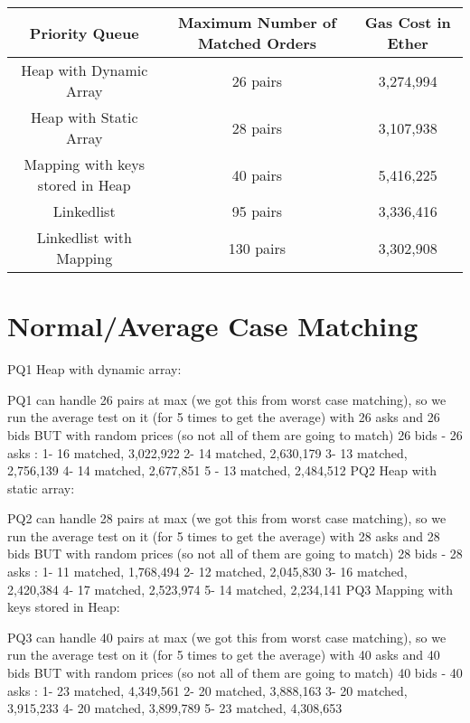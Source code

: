 \begin{table}[t]
\centering
\begin{tabular}{|c|c|c|}
\hline
\textbf{Priority Queue} & \textbf{Maximum Number of Matched Orders} & \textbf{Gas Cost in Ether}  \\ \hline
 
Heap with Dynamic Array & 26 pairs & 3,274,994 \\ \hline
Heap with Static Array & 28 pairs & 3,107,938 \\ \hline
Mapping with keys stored in Heap & 40 pairs & 5,416,225 \\ \hline
Linkedlist & 95 pairs & 3,336,416 \\ \hline
Linkedlist with Mapping & 130 pairs & 3,302,908 \\ \hline

\end{tabular}
\caption{\footnotesize{}\label{tab:worst_case_matching}}
\end{table}

 \section{Normal/Average Case Matching}
 

 
PQ1 Heap with dynamic array:

 PQ1 can handle 26 pairs at max (we got this from worst case matching), so we run the average test on it (for 5 times to get the average) with 26 asks and 26 bids BUT with random prices (so not all of them are going to match)
26 bids - 26 asks : 
1- 16 matched, 3,022,922
2- 14 matched, 2,630,179
3- 13 matched, 2,756,139
4- 14 matched, 2,677,851
5 - 13 matched, 2,484,512
PQ2 Heap with static array:

 PQ2 can handle 28 pairs at max (we got this from worst case matching), so we run the average test on it (for 5 times to get the average) with 28 asks and 28 bids BUT with random prices (so not all of them are going to match)
28 bids - 28 asks : 
1- 11 matched, 1,768,494
2- 12 matched, 2,045,830
3- 16 matched, 2,420,384
4- 17 matched, 2,523,974
5- 14 matched, 2,234,141
PQ3 Mapping with keys stored in Heap:

 PQ3 can handle 40 pairs at max (we got this from worst case matching), so we run the average test on it (for 5 times to get the average) with 40 asks and 40 bids BUT with random prices (so not all of them are going to match)
40 bids - 40 asks : 
1- 23 matched, 4,349,561
2- 20 matched, 3,888,163
3- 20 matched, 3,915,233
4- 20 matched, 3,899,789
5- 23 matched, 4,308,653

